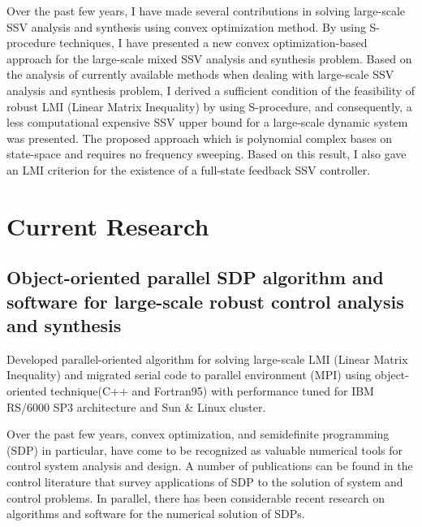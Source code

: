 \documentclass{article}
\begin{document}
Over the past few years, I have made several contributions in solving large-scale SSV analysis and synthesis
using convex optimization method.
By using S-procedure techniques, I have presented a new convex optimization-based
approach for the large-scale mixed SSV analysis and synthesis problem.
Based on the analysis of currently available methods when dealing with large-scale SSV analysis and synthesis problem,
I derived a sufficient condition of the feasibility of robust LMI (Linear Matrix Inequality)
by using S-procedure, and consequently, a less computational expensive SSV upper bound for
a large-scale dynamic system was presented.
The proposed approach {\citep{FYH03}} which is polynomial complex bases on state-space and requires no frequency sweeping.
Based on this result, I also gave an LMI criterion for the existence of a full-state feedback SSV controller.

\section{Current Research}
\subsection{Object-oriented parallel SDP algorithm and software for large-scale robust control analysis and synthesis}
Developed parallel-oriented algorithm for solving large-scale LMI (Linear Matrix Inequality)
and migrated serial code to parallel environment (MPI) using object-oriented technique(C++ and Fortran95)
with performance tuned for IBM RS/6000 SP3 architecture and Sun \& Linux cluster.

Over the past few years, convex optimization, and semidefinite programming (SDP) in particular, have
come to be recognized as valuable numerical tools for control system analysis and design.
A number of publications can be found in the control literature that survey applications of
SDP to the solution of system and control problems. In parallel, there has been considerable
recent research on algorithms and software for the numerical solution of SDPs.



\end{document}
